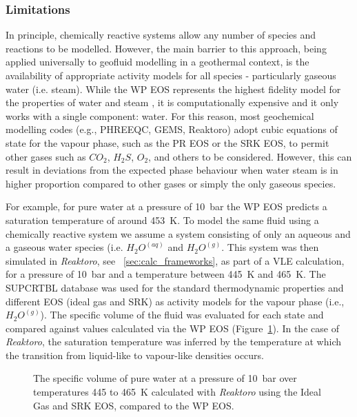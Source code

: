     \subsubsection{Limitations}
    \label{sec:chemically_active_system_limitations}
    In principle, chemically reactive systems allow any number of species and reactions to be modelled. However, the main barrier to this approach, being applied universally to geofluid modelling in a geothermal context, is the availability of appropriate activity models for all species - particularly gaseous water (i.e. steam). While the \ac{WP} \ac{EOS} represents the highest fidelity model for the properties of water and steam \cite{IAPWS2018}, it is computationally expensive and it only works with a single component: water. For this reason, most geochemical modelling codes (e.g., PHREEQC, GEMS, Reaktoro) adopt cubic equations of state for the vapour phase, such as the \ac{PR} \ac{EOS} or the \ac{SRK} \ac{EOS}, to permit other gases such as \(CO_2\), \(H_2S\), \(O_2\), and others to be considered. However, this can result in deviations from the expected phase behaviour when water steam is in higher proportion compared to other gases or simply the only gaseous species.

    For example, for pure water at a pressure of \qty{10}{\bar} the \ac{WP} \ac{EOS} predicts a saturation temperature of around \qty{453}{\K}. To model the same fluid using a chemically reactive system we assume a system consisting of only an aqueous and a gaseous water species (i.e. \(H_2O^{(aq)}\) and \(H_2O^{(g)}\). This system was then simulated in \emph{Reaktoro}, see ~\ref{sec:calc_frameworks}, as part of a \ac{VLE} calculation, for a pressure of \qty{10}{\bar} and a temperature between \qty{445}{\K} and \qty{465}{\K}. The SUPCRTBL database was used for the standard thermodynamic properties and different \ac{EOS} (ideal gas and \ac{SRK}) as activity models for the vapour phase (i.e., \(H_2O^{(g)}\)). The specific volume of the fluid was evaluated for each state and compared against values calculated via the \ac{WP} \ac{EOS} (Figure~\ref{fig:Tsat_at_P}). In the case of \emph{Reaktoro}, the saturation temperature was inferred by the temperature at which the transition from liquid-like to vapour-like densities occurs.

    \begin{figure}[H]
        \centering
        
        \caption[The specific volume of water as calculated with \emph{Reaktoro}]{The specific volume of pure water at a pressure of \qty{10}{\bar} over temperatures \num{445} to \qty{465}{\K} calculated with \emph{Reaktoro} using the Ideal Gas and \ac{SRK} \ac{EOS}, compared to the \ac{WP} \ac{EOS}.}
        \label{fig:Tsat_at_P}
    \end{figure}

